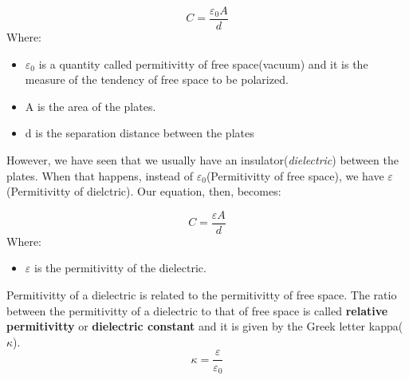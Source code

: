 \documentclass[9pt,addpoints]{exam}
\begin{document}
		\begin{equation}
			C = \frac{\varepsilon_0A}{d}
		\end{equation}
		Where:
		\begin{itemize}
			\item $\varepsilon_0$ is a quantity called permitivitty of free space(vacuum) and it is the measure of the tendency of free space to be polarized. 
			\item A is the area of the plates.
			\item d is the separation distance between the plates
		\end{itemize}
	However, we have seen that we usually have an insulator(\textit{dielectric}) between the plates. When that happens, instead of $\varepsilon_0$(Permitivitty of free space), we have $\varepsilon$(Permitivitty of dielctric). Our equation, then, becomes:
	
			$$ C = \frac{\varepsilon A}{d}$$
		Where:
		\begin{itemize}
			\item $\varepsilon$ is the permitivitty of the dielectric.
		\end{itemize}    
		Permitivitty of a dielectric is related to the permitivitty of free space. The ratio between the permitivitty of a dielectric to that of free space is called \textbf{relative permitivitty} or \textbf{dielectric constant} and it is given by the Greek letter kappa($\kappa$).
			$$\kappa = \frac{\varepsilon}{\varepsilon_0}$$	
\end{document}
